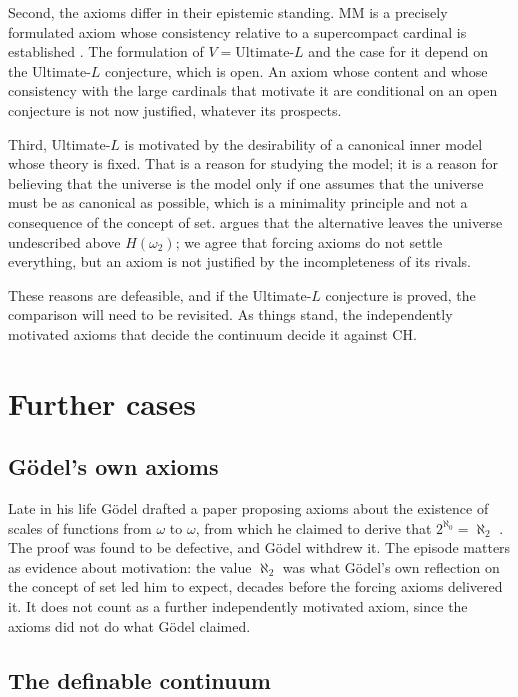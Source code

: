 \documentclass{situationist-preprint}
\begin{document}
Second, the axioms differ in their epistemic standing. MM is a precisely formulated axiom whose consistency relative to a supercompact cardinal is established \citep{FMS1988}. The formulation of $V = \text{Ultimate-}L$ and the case for it depend on the Ultimate-$L$ conjecture, which is open. An axiom whose content and whose consistency with the large cardinals that motivate it are conditional on an open conjecture is not now justified, whatever its prospects.

Third, Ultimate-$L$ is motivated by the desirability of a canonical inner model whose theory is fixed. That is a reason for studying the model; it is a reason for believing that the universe is the model only if one assumes that the universe must be as canonical as possible, which is a minimality principle and not a consequence of the concept of set. \citet{Woodin2017} argues that the alternative leaves the universe undescribed above $H(\omega_2)$; we agree that forcing axioms do not settle everything, but an axiom is not justified by the incompleteness of its rivals.

These reasons are defeasible, and if the Ultimate-$L$ conjecture is proved, the comparison will need to be revisited. As things stand, the independently motivated axioms that decide the continuum decide it against CH.

\section{Further cases}\label{s:cases}

\subsection{Gödel's own axioms}

Late in his life Gödel drafted a paper proposing axioms about the existence of scales of functions from $\omega$ to $\omega$, from which he claimed to derive that $2^{\aleph_0} = \aleph_2$ \citep{Godel1995}. The proof was found to be defective, and Gödel withdrew it. The episode matters as evidence about motivation: the value $\aleph_2$ was what Gödel's own reflection on the concept of set led him to expect, decades before the forcing axioms delivered it. It does not count as a further independently motivated axiom, since the axioms did not do what Gödel claimed.

\subsection{The definable continuum}
\end{document}
